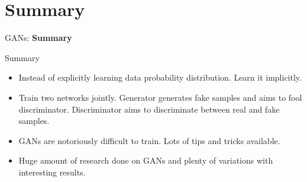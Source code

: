 \section{Summary}
\begin{frame}{}
    \LARGE GANs: \textbf{Summary}
\end{frame}

\begin{frame}{Summary}
\begin{itemize}
    \item Instead of explicitly learning data probability distribution. Learn it implicitly.
    \item Train two networks jointly. Generator generates fake samples and aims to fool discriminator. Discriminator aims to discriminate between real and fake samples.
    \item GANs are notoriously difficult to train. Lots of tips and tricks available.
    \item Huge amount of research done on GANs and plenty of variations with interesting results.
\end{itemize}
\end{frame}

